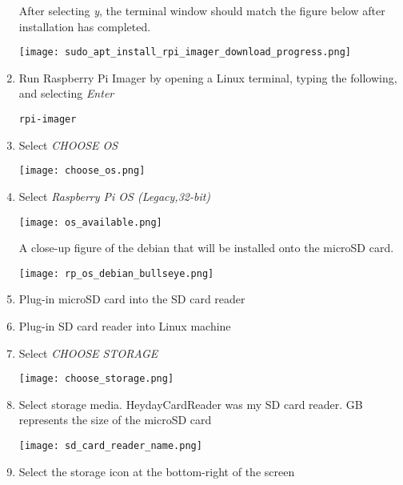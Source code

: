 \documentclass[journal]{IEEEtran}
\begin{document}
\begin{enumerate}
        After selecting \emph{y}, the terminal window should match the figure below after installation has completed. \newline

        \texttt{[image: sudo\_apt\_install\_rpi\_imager\_download\_progress.png]}

        \item Run Raspberry Pi Imager by opening a Linux terminal, typing the following, and selecting \emph{Enter}
        
        \begin{lstlisting}[frame=single]
            rpi-imager
        \end{lstlisting}

        \item Select \emph{CHOOSE OS}

        \texttt{[image: choose\_os.png]}
        
        \item Select \emph{Raspberry Pi OS (Legacy,32-bit)}
        
        \texttt{[image: os\_available.png]} \newline

        A close-up figure  of the debian that will be installed onto the microSD card. \newline

        \texttt{[image: rp\_os\_debian\_bullseye.png]}
        
        \item Plug-in microSD card into the SD card reader
        \item Plug-in SD card reader into Linux machine

        \item Select \emph{CHOOSE STORAGE}
        
        \texttt{[image: choose\_storage.png]}
        
        \item Select storage media. \newline
        HeydayCardReader was my SD card reader.  GB represents the size of the microSD card

        \texttt{[image: sd\_card\_reader\_name.png]}

        \item Select the storage icon at the bottom-right of the screen \newline
        

\end{enumerate}
\end{document}
